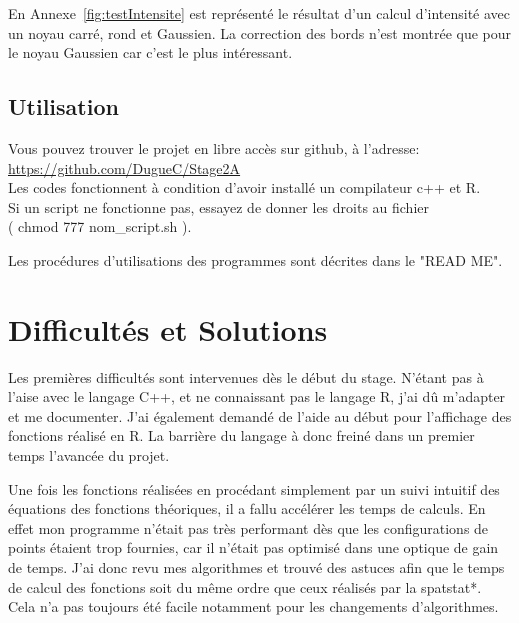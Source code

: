 \documentclass[stage2a]{tnreport}
\begin{document}
En Annexe~\ref{fig:testIntensite} est représenté le résultat d'un calcul d'intensité avec un noyau carré, rond et Gaussien. La correction des bords n'est montrée que pour le noyau Gaussien car c'est le plus intéressant.


\subsection{Utilisation}

Vous pouvez trouver le projet en libre accès sur github, à l'adresse:\\
\hspace*{2cm} \url{https://github.com/DugueC/Stage2A}\\

Les codes fonctionnent à condition d'avoir installé un compilateur c++ et R.\\
Si un script ne fonctionne pas, essayez de donner les droits au fichier\\ ( chmod 777 nom\_script.sh ).

Les procédures d'utilisations des programmes sont décrites dans le "READ ME".


\section{Difficultés et Solutions}

Les premières difficultés sont intervenues dès le début du stage. N'étant pas à l'aise avec le langage C++, et ne connaissant pas le langage R, j'ai dû m'adapter et me documenter. J'ai également demandé de l'aide au début pour l'affichage des fonctions réalisé en R. La barrière du langage à donc freiné dans un premier temps l'avancée du projet.

Une fois les fonctions réalisées en procédant simplement par un suivi intuitif des équations des fonctions théoriques, il a fallu accélérer les temps de calculs. En effet mon programme n'était pas très performant dès que les configurations de points étaient trop fournies, car il n'était pas optimisé dans une optique de gain de temps. J'ai donc revu mes algorithmes et trouvé des astuces afin que le temps de calcul des fonctions soit du même ordre que ceux réalisés par la \gls{spatstat}*. Cela n'a pas toujours été facile notamment pour les changements d'algorithmes.

\end{document}
